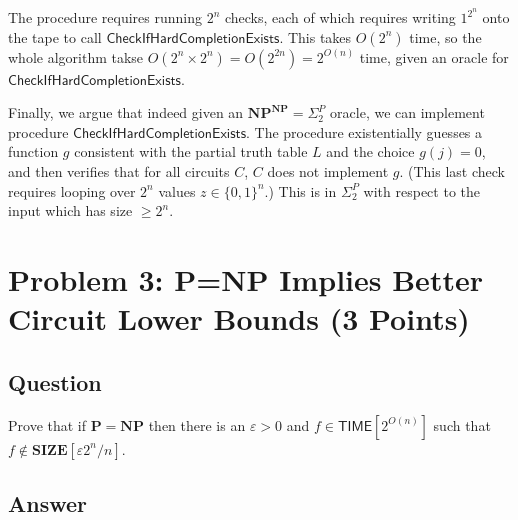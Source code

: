 \documentclass{article}
\renewcommand{\P}{\mathbf{P}}
\newcommand{\NP}{\mathbf{NP}}
\newcommand{\TIME}{\mathbf{TIME}}
\newcommand{\SIZE}{\mathbf{SIZE}}
\def \TIME{{\mathsf{TIME}}}
\begin{document}
The procedure requires running $2^n$ checks, each of which requires writing $1^{2^n}$ onto the tape to call $\mathsf{CheckIfHardCompletionExists}$.
This takes $O(2^n)$ time, so the whole algorithm takse $O(2^n \times 2^n) = O(2^{2n}) = 2^{O(n)}$ time, given an oracle for $\mathsf{CheckIfHardCompletionExists}$.

Finally, we argue that indeed given an $\NP^\NP = \Sigma_2^P$ oracle, we can implement procedure $\mathsf{CheckIfHardCompletionExists}$.
The procedure existentially guesses a function $g$ consistent with the partial truth table $L$ and the choice $g(j) = 0$, and then verifies that for all circuits $C$, $C$ does not implement $g$.  (This last check requires looping over $2^n$ values $z \in \{0, 1\}^n$.)  This is in $\Sigma_2^P$ with respect to the input which has size $\geq 2^n$.













\newpage

\section*{Problem 3: P=NP Implies Better Circuit Lower Bounds (3 Points)}

\subsection*{Question}
Prove that if $\P = \NP$ then there is an $\varepsilon > 0$ and $f \in \TIME[2^{O(n)}]$ such that $f \notin \SIZE[\varepsilon 2^n/n]$. 

\subsection*{Answer}
\end{document}
